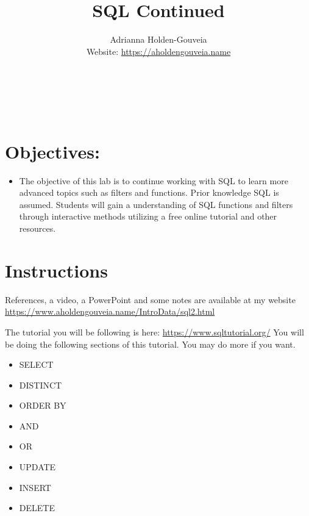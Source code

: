 \documentclass[12pt]{article}
\title{SQL Continued}
\author{
        Adrianna Holden-Gouveia \\
        Website: \url{https://aholdengouveia.name}\\ 
        \date{\vspace{-5ex}}
        \faLinkedin{: aholdengouveia} \\
        \faGithub {: aholdengouveia} \\
        \faTwitter {: aholdengouveia} \\
        }
\begin{document}
    

\maketitle


\section*{Objectives:}
\begin{itemize}
    \item The objective of this lab is to continue working with SQL to learn more advanced topics such as filters and functions. Prior knowledge SQL is assumed. Students will gain a understanding of SQL functions and filters through interactive methods utilizing a free online tutorial and other resources.
\end{itemize}
\section*{Instructions}

References, a video, a PowerPoint and some notes are available at my website
\url {https://www.aholdengouveia.name/IntroData/sql2.html}

The tutorial you will be following is here: \url{https://www.sqltutorial.org/} 
You will be doing the following sections of this tutorial.  You may do more if you want.
\begin{itemize}
    \item SELECT
    \item DISTINCT
    \item ORDER BY
    \item AND
    \item OR
    \item UPDATE
    \item INSERT
    \item DELETE
\end{itemize}
\end{document}
